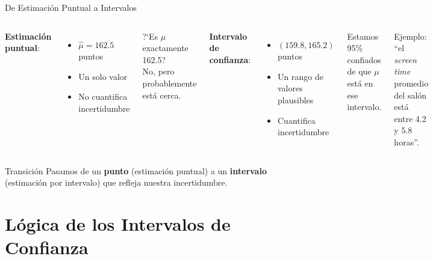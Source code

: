 \documentclass[aspectratio=169, 11pt]{beamer}
\begin{document}
\begin{frame}{De Estimación Puntual a Intervalos}
\begin{columns}[c]
\textbf{Estimaci\'on puntual}:
\begin{itemize}
  \item $\hat{\mu} = 162.5$ puntos
  \item Un solo valor
  \item No cuantifica incertidumbre
\end{itemize}

\vspace{0.5cm}
?`Es $\mu$ exactamente 162.5?\\
\alert{No}, pero probablemente est\'a cerca.

\textbf{Intervalo de confianza}:
\begin{itemize}
  \item $(159.8, 165.2)$ puntos
  \item Un rango de valores plausibles
  \item Cuantifica incertidumbre
\end{itemize}

\vspace{0.5cm}
Estamos \alert{95\% confiados} de que $\mu$ est\'a en ese intervalo.

\vspace{0.3cm}
\small Ejemplo: ``el \emph{screen time} promedio del sal\'on est\'a entre 4.2 y 5.8 horas''.
\end{columns}

\vspace{0.5cm}
\begin{block}{Transición}
Pasamos de un \textbf{punto} (estimación puntual) a un \textbf{intervalo} (estimación por intervalo) que refleja nuestra incertidumbre.
\end{block}
\end{frame}

\section{Lógica de los Intervalos de Confianza}
\end{document}

